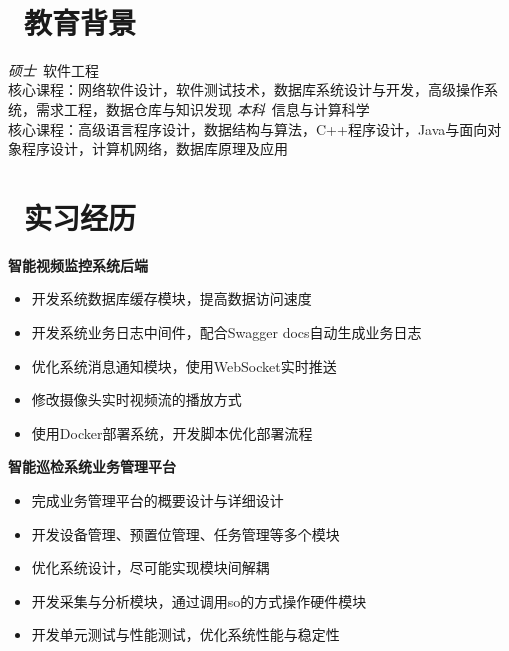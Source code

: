 \documentclass{resume}
\begin{document}


  \centerline { \textperiodcentered\ 
  }

\section{\faGraduationCap\ 教育背景}
\textit{硕士}\ 软件工程
\\核心课程：网络软件设计，软件测试技术，数据库系统设计与开发，高级操作系统，需求工程，数据仓库与知识发现
\textit{本科}\ 信息与计算科学
\\核心课程：高级语言程序设计，数据结构与算法，C++程序设计，Java与面向对象程序设计，计算机网络，数据库原理及应用

\section{\faBriefcase\ 实习经历}
\textbf{智能视频监控系统后端}
\begin{itemize}
  \item 开发系统数据库缓存模块，提高数据访问速度
  \item 开发系统业务日志中间件，配合Swagger docs自动生成业务日志
  \item 优化系统消息通知模块，使用WebSocket实时推送
  \item 修改摄像头实时视频流的播放方式
  \item 使用Docker部署系统，开发脚本优化部署流程
\end{itemize}

\textbf{智能巡检系统业务管理平台}
\begin{itemize}
  \item 完成业务管理平台的概要设计与详细设计
  \item 开发设备管理、预置位管理、任务管理等多个模块
  \item 优化系统设计，尽可能实现模块间解耦
  \item 开发采集与分析模块，通过调用so的方式操作硬件模块
  \item 开发单元测试与性能测试，优化系统性能与稳定性
\end{itemize}
\end{document}
